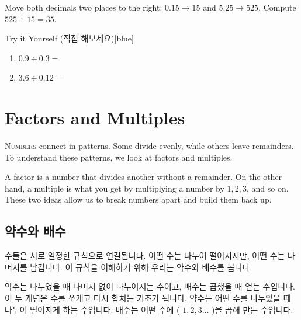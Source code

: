 \documentclass[12pt]{book}
\begin{document}
  Move both decimals two places to the right: $0.15 \to 15$ and $5.25 \to 525$.  
  Compute $525\div15=35$.
  
  
  \begin{flexbox}{Try it Yourself (직접 해보세요)}[blue]
  \begin{enumerate}
    \item $0.9 \div 0.3=$ \vspace*{20pt}
    \item $3.6 \div 0.12=$ \vspace*{20pt}
  \end{enumerate}
  \end{flexbox}
  













  
  \onesidedpaper\chapter{Factors and Multiples}
  \lettrine{N}{umbers} connect in patterns. Some divide evenly, while others leave 
  remainders. To understand these patterns, we look at factors and 
  multiples. 
  
  A factor is a number that divides another without a 
  remainder. On the other hand, a multiple is what you get by 
  multiplying a number by $1,2,3$, and so on. These two ideas 
  allow us to break numbers apart and build them back up.
  
  \section*{약수와 배수}
  수들은 서로 일정한 규칙으로 연결됩니다. 어떤 수는 나누어 떨어지지만, 어떤 
  수는 나머지를 남깁니다. 이 규칙을 이해하기 위해 우리는 약수와 배수를 봅니다. 
  
  약수는 나누었을 때 나머지 없이 나누어지는 수이고, 배수는 곱했을 때 얻는 
  수입니다. 이 두 개념은 수를 쪼개고 다시 합치는 기초가 됩니다. 약수는 어떤 
  수를 나누었을 때 나누어 떨어지게 하는 수입니다. 배수는 어떤 수에 ( 
  $1,2,3 \ldots$ )을 곱해 만든 수입니다.
\end{document}

